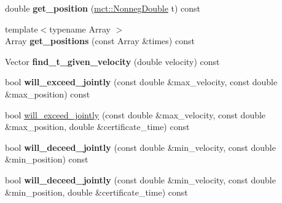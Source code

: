 \begin{DoxyCompactItemize}
\item 
double {\bfseries get\+\_\+position} (\hyperlink{classmct_1_1NonnegDouble}{mct\+::\+Nonneg\+Double} t) const \hypertarget{classmct_1_1LinearDynamicsWithAccelerationConstraint_a79216cc4eef7308542d9811b8c44ecf6}{}\label{classmct_1_1LinearDynamicsWithAccelerationConstraint_a79216cc4eef7308542d9811b8c44ecf6}

\item 
{\footnotesize template$<$typename Array $>$ }\\Array {\bfseries get\+\_\+positions} (const Array \&times) const \hypertarget{classmct_1_1LinearDynamicsWithAccelerationConstraint_adaa181c2109d4f4098e7833e58ce929d}{}\label{classmct_1_1LinearDynamicsWithAccelerationConstraint_adaa181c2109d4f4098e7833e58ce929d}

\item 
Vector {\bfseries find\+\_\+t\+\_\+given\+\_\+velocity} (double velocity) const \hypertarget{classmct_1_1LinearDynamicsWithAccelerationConstraint_a9ce476e49904c83c85af67f5be5a5e2d}{}\label{classmct_1_1LinearDynamicsWithAccelerationConstraint_a9ce476e49904c83c85af67f5be5a5e2d}

\item 
bool {\bfseries will\+\_\+exceed\+\_\+jointly} (const double \&max\+\_\+velocity, const double \&max\+\_\+position) const \hypertarget{classmct_1_1LinearDynamicsWithAccelerationConstraint_a941585f2acda77a22a3a269ba6873afb}{}\label{classmct_1_1LinearDynamicsWithAccelerationConstraint_a941585f2acda77a22a3a269ba6873afb}

\item 
bool \hyperlink{classmct_1_1LinearDynamicsWithAccelerationConstraint_a568991a3b2459be274a86298caf8356c}{will\+\_\+exceed\+\_\+jointly} (const double \&max\+\_\+velocity, const double \&max\+\_\+position, double \&certificate\+\_\+time) const 
\item 
bool {\bfseries will\+\_\+deceed\+\_\+jointly} (const double \&min\+\_\+velocity, const double \&min\+\_\+position) const \hypertarget{classmct_1_1LinearDynamicsWithAccelerationConstraint_a9c94e5e278cb7519215a5495f326b11c}{}\label{classmct_1_1LinearDynamicsWithAccelerationConstraint_a9c94e5e278cb7519215a5495f326b11c}

\item 
bool {\bfseries will\+\_\+deceed\+\_\+jointly} (const double \&min\+\_\+velocity, const double \&min\+\_\+position, double \&certificate\+\_\+time) const \hypertarget{classmct_1_1LinearDynamicsWithAccelerationConstraint_ae3c5bef385c2bcb64b5a7cd9dae42654}{}\label{classmct_1_1LinearDynamicsWithAccelerationConstraint_ae3c5bef385c2bcb64b5a7cd9dae42654}

\end{DoxyCompactItemize}
